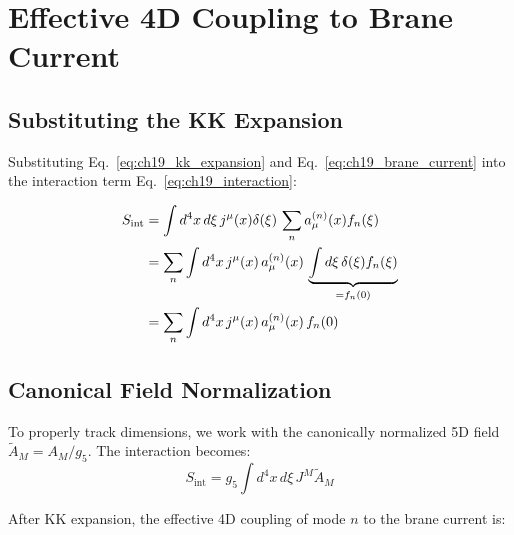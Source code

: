 
\section{Effective 4D Coupling to Brane Current}
\label{sec:ch19_4d_coupling}

\subsection{Substituting the KK Expansion}

Substituting Eq.~\eqref{eq:ch19_kk_expansion} and Eq.~\eqref{eq:ch19_brane_current}
into the interaction term Eq.~\eqref{eq:ch19_interaction}:

\begin{align}
    S_{\text{int}} &= \int d^4x \, d\xi \, j^\mu(x) \delta(\xi) \,
    \sum_n a_\mu^{(n)}(x) f_n(\xi) \notag \\
    &= \sum_n \int d^4x \, j^\mu(x) \, a_\mu^{(n)}(x) \,
    \underbrace{\int d\xi \, \delta(\xi) f_n(\xi)}_{= f_n(0)} \notag \\
    &= \sum_n \int d^4x \, j^\mu(x) \, a_\mu^{(n)}(x) \, f_n(0)
    \label{eq:ch19_int_expanded}
\end{align}

\subsection{Canonical Field Normalization}

To properly track dimensions, we work with the canonically normalized 5D field
$\tilde{A}_M = A_M / g_5$. The interaction becomes:
\begin{equation}
    S_{\text{int}} = g_5 \int d^4x \, d\xi \, J^M \tilde{A}_M
\end{equation}

After KK expansion, the effective 4D coupling of mode $n$ to the brane current is:

